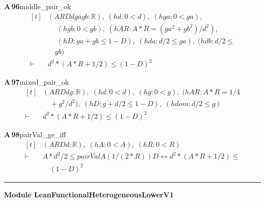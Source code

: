 \documentclass[conference]{IEEEtran}
\theoremstyle{definition}
\newcommand{\lean}[1]{\textsf{\footnotesize #1}}
\begin{document}
\noindent\textbf{A\,96}\quad\lean{middle\_pair\_ok}
{\footnotesize\[ \begin{aligned}[t]
&(\mathit{A} \mathit{R} \mathit{D} \mathit{d} \mathit{ga} \mathit{gb} : \mathbb{R} ),\; (\mathit{hd} : 0 < \mathit{d}),\; (\mathit{hga} : 0 < \mathit{ga}),\\
&\quad \; (\mathit{hgb} : 0 < \mathit{gb}),\; (\mathit{hAR} : \mathit{A} * \mathit{R} = (\mathit{ga} ^{2} + \mathit{gb} ^{2}) / \mathit{d} ^{2}),\\
&\quad \; (\mathit{hD} : \mathit{ga} + \mathit{gb} \leq 1 - \mathit{D}),\; (\mathit{hda} : \mathit{d} / 2 \leq \mathit{ga}),\; (\mathit{hdb} : \mathit{d} / 2 \leq\\
&\quad \mathit{gb})\\
\vdash\;&\mathit{d} ^{2} * (\mathit{A} * \mathit{R} + 1 / 2) \leq (1 - \mathit{D}) ^{2}
\end{aligned} \]}

\noindent\textbf{A\,97}\quad\lean{mixed\_pair\_ok}
{\footnotesize\[ \begin{aligned}[t]
&(\mathit{A} \mathit{R} \mathit{D} \mathit{d} \mathit{g} : \mathbb{R} ),\; (\mathit{hd} : 0 < \mathit{d}),\; (\mathit{hg} : 0 < \mathit{g}),\; (\mathit{hAR} : \mathit{A} * \mathit{R} = 1 / 4\\
&\quad + \mathit{g} ^{2} / \mathit{d} ^{2}),\; (\mathit{hD} : \mathit{g} + \mathit{d} / 2 \leq 1 - \mathit{D}),\; (\mathit{hdom} : \mathit{d} / 2 \leq \mathit{g})\\
\vdash\;&\mathit{d} ^{2} * (\mathit{A} * \mathit{R} + 1 / 2) \leq (1 - \mathit{D}) ^{2}
\end{aligned} \]}

\noindent\textbf{A\,98}\quad\lean{pairVal\_ge\_iff}
{\footnotesize\[ \begin{aligned}[t]
&(\mathit{A} \mathit{R} \mathit{D} \mathit{d} : \mathbb{R} ),\; (\mathit{hA} : 0 < \mathit{A}),\; (\mathit{hR} : 0 < \mathit{R})\\
\vdash\;&\mathit{A} * \mathit{d} ^{2} / 2 \leq \mathit{pairVal} \mathit{A} (1 / (2 * \mathit{R})) \mathit{D} \leftrightarrow \mathit{d} ^{2} * (\mathit{A} * \mathit{R} + 1 / 2) \leq\\
&\quad (1 - \mathit{D}) ^{2}
\end{aligned} \]}

\vspace{4pt}\noindent\rule{\columnwidth}{0.4pt}\par\vspace{2pt}
\noindent\textbf{Module \lean{LeanFunctionalHeterogeneousLowerV1}}\par\vspace{3pt}
\end{document}
